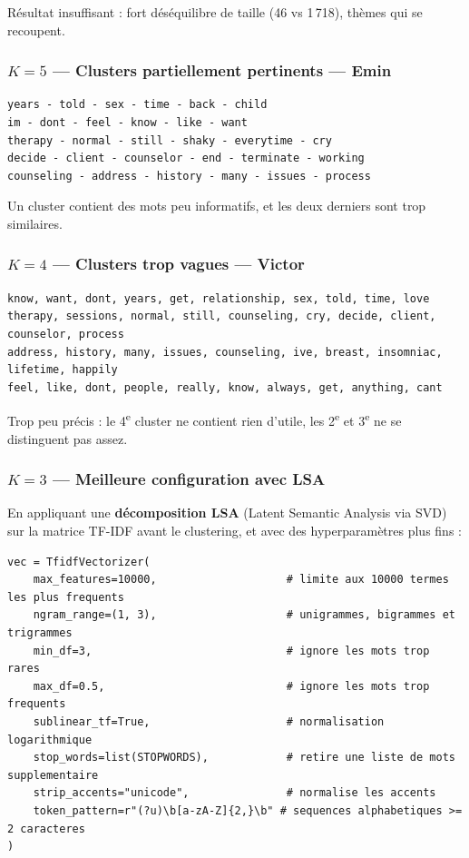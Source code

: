 \documentclass[12pt,a4paper]{article}
\begin{document}
\begin{avertissement}
Résultat insuffisant : fort déséquilibre de taille (46 vs 1\,718), thèmes qui se recoupent.
\end{avertissement}

\subsubsection*{$K = 5$ --- Clusters partiellement pertinents --- Emin}

\begin{lstlisting}[language={}]
years - told - sex - time - back - child
im - dont - feel - know - like - want
therapy - normal - still - shaky - everytime - cry
decide - client - counselor - end - terminate - working
counseling - address - history - many - issues - process
\end{lstlisting}

Un cluster contient des mots peu informatifs, et les deux derniers sont trop similaires.

\subsubsection*{$K = 4$ --- Clusters trop vagues --- Victor}

\begin{lstlisting}[language={}]
know, want, dont, years, get, relationship, sex, told, time, love
therapy, sessions, normal, still, counseling, cry, decide, client, counselor, process
address, history, many, issues, counseling, ive, breast, insomniac, lifetime, happily
feel, like, dont, people, really, know, always, get, anything, cant
\end{lstlisting}

Trop peu précis : le 4\textsuperscript{e} cluster ne contient rien d'utile, les 2\textsuperscript{e} et 3\textsuperscript{e} ne se distinguent pas assez.

\subsubsection*{$K = 3$ --- Meilleure configuration avec LSA}

En appliquant une \textbf{décomposition LSA} (Latent Semantic Analysis via SVD) sur la matrice TF-IDF avant le clustering, et avec des hyperparamètres plus fins :

\begin{lstlisting}
vec = TfidfVectorizer(
    max_features=10000,                    # limite aux 10000 termes les plus frequents
    ngram_range=(1, 3),                    # unigrammes, bigrammes et trigrammes
    min_df=3,                              # ignore les mots trop rares
    max_df=0.5,                            # ignore les mots trop frequents
    sublinear_tf=True,                     # normalisation logarithmique
    stop_words=list(STOPWORDS),            # retire une liste de mots supplementaire
    strip_accents="unicode",               # normalise les accents
    token_pattern=r"(?u)\b[a-zA-Z]{2,}\b" # sequences alphabetiques >= 2 caracteres
)
\end{lstlisting}
\end{document}
